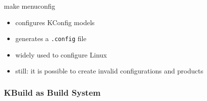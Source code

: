 \begin{frame}{\myframetitle}
	\begin{mycolumns}[widths={60,40}]
		\begin{exampletight}{}
		\end{exampletight}
	\mynextcolumn
		\begin{note}{make menuconfig}
			\begin{itemize}
				\item configures KConfig models
				\item generates a \texttt{.config} file
				\item widely used to configure Linux
				\item still: it is possible to create invalid configurations and products %
			\end{itemize}
		\end{note}
	\end{mycolumns}
\end{frame}

\subsubsection*{KBuild as Build System}

